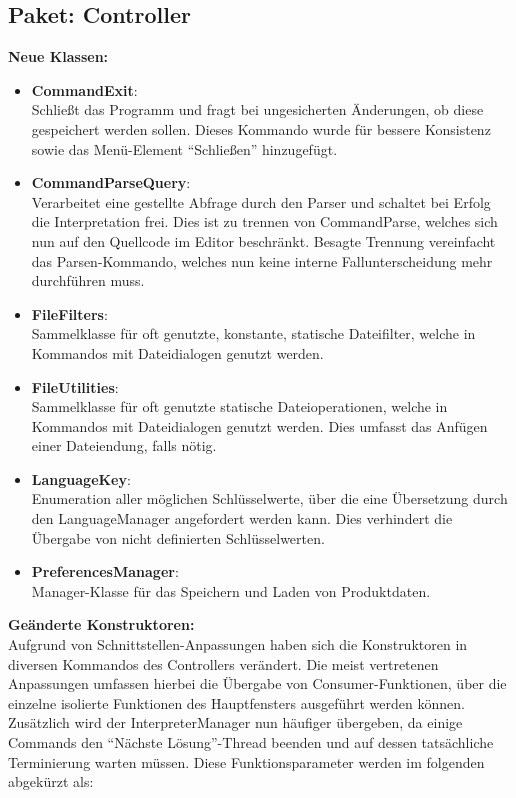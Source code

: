 \documentclass[parskip=full,11pt,twoside]{scrartcl}
\begin{document}
\subsection{Paket: Controller}
\textbf{Neue Klassen:}\\
\begin{itemize}
	\item \textbf{CommandExit}:\\
	Schließt das Programm und fragt bei ungesicherten Änderungen, ob diese gespeichert werden sollen. Dieses Kommando wurde für bessere Konsistenz sowie das Menü-Element \enquote{Schließen} hinzugefügt.
	\item \textbf{CommandParseQuery}:\\
	Verarbeitet eine gestellte Abfrage durch den Parser und schaltet bei Erfolg die Interpretation frei. Dies ist zu trennen von CommandParse, welches sich nun auf den Quellcode im Editor beschränkt. Besagte Trennung vereinfacht das Parsen-Kommando, welches nun keine interne Fallunterscheidung mehr durchführen muss.
	\item \textbf{FileFilters}:\\
	Sammelklasse für oft genutzte, konstante, statische Dateifilter, welche in Kommandos mit Dateidialogen genutzt werden.
	\item \textbf{FileUtilities}:\\
	Sammelklasse für oft genutzte statische Dateioperationen, welche in Kommandos mit Dateidialogen genutzt werden. Dies umfasst das Anfügen einer Dateiendung, falls nötig.
	\item \textbf{LanguageKey}:\\
	Enumeration aller möglichen Schlüsselwerte, über die eine Übersetzung durch den LanguageManager angefordert werden kann. Dies verhindert die Übergabe von nicht definierten Schlüsselwerten.
	\item \textbf{PreferencesManager}:\\
	Manager-Klasse für das Speichern und Laden von Produktdaten.
\end{itemize}

\textbf{Geänderte Konstruktoren:}\\
Aufgrund von Schnittstellen-Anpassungen haben sich die Konstruktoren in diversen Kommandos des Controllers verändert. Die meist vertretenen Anpassungen umfassen hierbei die Übergabe von Consumer-Funktionen, über die einzelne isolierte Funktionen des Hauptfensters ausgeführt werden können. Zusätzlich wird der InterpreterManager nun häufiger übergeben, da einige Commands den \enquote{Nächste Lösung}-Thread beenden und auf dessen tatsächliche Terminierung warten müssen. Diese Funktionsparameter werden im folgenden abgekürzt als:
\end{document}
